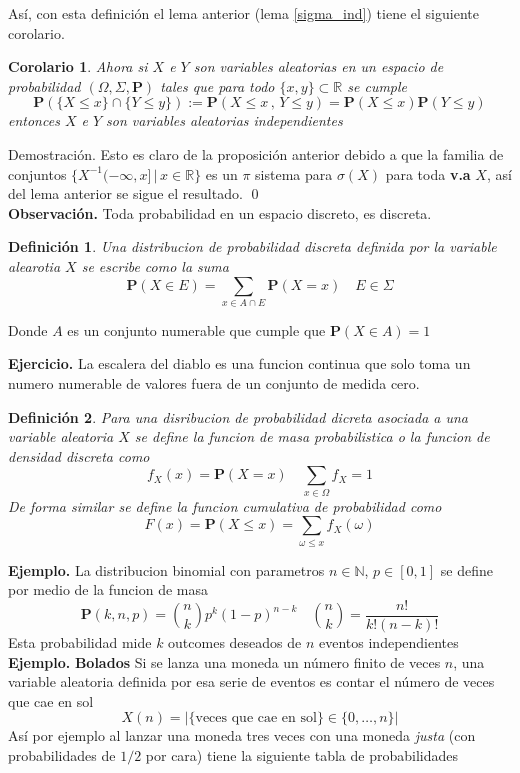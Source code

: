 \documentclass[letterpaper]{book}
\newtheorem{cor}[teorema]{Corolario}
\newtheorem{def.}{Definici\'on}[section]
\newcommand{\nat}{\ensuremath{ \mathbb N }}
\newcommand{\prob}{\textbf{P}}
\newcommand{\eje}{{\newline \noindent \sc \textbf{Ejercicio. }}}
\newcommand{\exe}{{\newline \noindent \sc \textbf{Ejemplo. }}}
\newcommand{\obs}{{\newline \noindent \sc \textbf{Observación. }}}
\newcommand{\dem}{{\noindent \sc Demostraci\'on. }}
\newcommand{\om}{\ensuremath{\Omega}}
\newcommand{\sig}{\ensuremath{\Sigma}}
\newcommand{\re}{\ensuremath{\mathbb R }}
\begin{document}
Así, con esta definición el lema anterior (lema \ref{sigma_ind}) tiene el siguiente corolario.

\begin{cor}
Ahora si $X$ e $Y$ son variables aleatorias en un espacio de probabilidad $(\om,\sig,\prob)$ tales que para todo $\{x,y\}\subset\re$ se cumple
\[
    \prob(\{X\leq x\}\cap\{Y\leq y\}):=\prob(X\leq x\,,\, Y\leq y)=\prob(X\leq x)\prob(Y\leq y)
\]
entonces $X$ e $Y$ son variables aleatorias independientes
\end{cor}
\dem
Esto es claro de la proposición anterior debido a que la familia de conjuntos \(\{X^{-1}(-\infty,x]\,\vert\,x\in\re\}\) es un \(\pi\) sistema para \(\sigma(X)\) para toda \textbf{v.a} \(X\), así del lema anterior se sigue el resultado.
\qed\\

\obs Toda probabilidad en un espacio discreto, es discreta.
\begin{def.}
Una distribucion de probabilidad discreta definida por la variable alearotia \(X\) se escribe como la suma
\[
    \prob(X\in E)=\sum_{x\in A\cap E}\prob(X=x)\quad E\in\sig
\]
\end{def.}
Donde \(A\) es un conjunto numerable que cumple que \(\prob(X\in A)=1\)

\eje La escalera del diablo es una funcion continua que solo toma un numero numerable de valores fuera de un conjunto de medida cero.

\begin{def.}
Para una disribucion de probabilidad dicreta asociada a una variable aleatoria \(X\) se define la \emph{funcion de masa probabilistica} o la \emph{funcion de densidad discreta} como
\[
        f_{X}(x)=\prob(X=x)\quad\sum_{x\in\om}f_{X}=1
\]
De forma similar se define la \emph{funcion cumulativa de probabilidad} como
\[
        F(x)=\prob(X\leq x)=\sum_{\omega\leq x}f_{X}(\omega)
\]
\end{def.}

\exe La distribucion binomial con parametros \(n\in\nat\), \(p\in[0,1]\) se define por medio de la funcion de masa
\[
    \prob(k,n,p)={n\choose k}p^{k}(1-p)^{n-k}\quad{n\choose k}=\frac{n!}{k!(n-k)!}
\]
Esta probabilidad mide \(k\) outcomes deseados de \(n\) eventos independientes
\exe \textbf{Bolados} Si se lanza una moneda un número finito de veces \(n\), una variable aleatoria definida por esa serie de eventos es contar el número de veces que cae en sol
\[
    X(n)=|\{\text{veces que cae en sol}\}\in\{0,\dots,n\}|
\]
\noindent Así por ejemplo al lanzar una moneda tres veces con una moneda \emph{justa} (con probabilidades de \(1/2\) por cara) tiene la siguiente tabla de probabilidades
\end{document}
